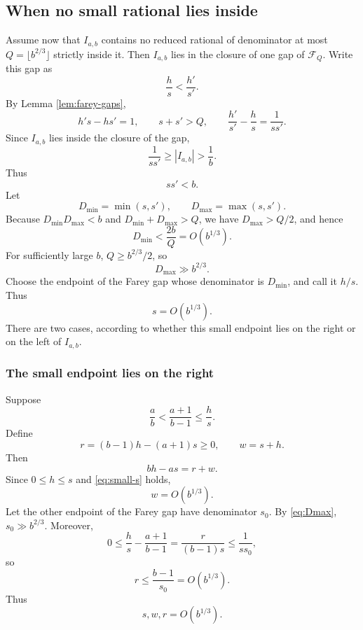 \documentclass[11pt]{article}
\numberwithin{equation}{section}
\theoremstyle{definition}
\theoremstyle{remark}
\newcommand{\1}{\mathbf 1}
\begin{document}
\subsection{When no small rational lies inside}

Assume now that $I_{a,b}$ contains no reduced rational of denominator at most $Q=\lfloor b^{2/3}\rfloor$ strictly inside it.  Then $I_{a,b}$ lies in the closure of one gap of $\mathcal F_Q$.  Write this gap as
\[
  \frac hs<\frac{h'}{s'}.
\]
By Lemma \ref{lem:farey-gaps},
\[
  h's-hs'=1,
  \qquad s+s'>Q,
  \qquad \frac{h'}{s'}-\frac hs=\frac1{ss'}.
\]
Since $I_{a,b}$ lies inside the closure of the gap,
\[
  \frac1{ss'}\ge |I_{a,b}|>\frac1b.
\]
Thus
\begin{equation}\label{eq:ssprime}
  ss'<b.
\end{equation}
Let
\[
  D_{\min}=\min(s,s'),\qquad D_{\max}=\max(s,s').
\]
Because $D_{\min}D_{\max}<b$ and $D_{\min}+D_{\max}>Q$, we have $D_{\max}>Q/2$, and hence
\begin{equation}\label{eq:Dmin}
  D_{\min}<\frac{2b}{Q}=O(b^{1/3}).
\end{equation}
For sufficiently large $b$, $Q\ge b^{2/3}/2$, so
\begin{equation}\label{eq:Dmax}
  D_{\max}\gg b^{2/3}.
\end{equation}
Choose the endpoint of the Farey gap whose denominator is $D_{\min}$, and call it $h/s$.  Thus
\begin{equation}\label{eq:small-s}
  s=O(b^{1/3}).
\end{equation}
There are two cases, according to whether this small endpoint lies on the right or on the left of $I_{a,b}$.

\subsubsection{The small endpoint lies on the right}

Suppose
\[
  \frac ab<\frac{a+1}{b-1}\le \frac hs.
\]
Define
\[
  r=(b-1)h-(a+1)s\ge0,
  \qquad
  w=s+h.
\]
Then
\begin{equation}\label{eq:rw-right}
  bh-as=r+w.
\end{equation}
Since $0\le h\le s$ and \eqref{eq:small-s} holds,
\[
  w=O(b^{1/3}).
\]
Let the other endpoint of the Farey gap have denominator $s_0$.  By \eqref{eq:Dmax}, $s_0\gg b^{2/3}$.  Moreover,
\[
  0\le \frac hs-\frac{a+1}{b-1}=\frac{r}{(b-1)s}\le \frac1{ss_0},
\]
so
\[
  r\le \frac{b-1}{s_0}=O(b^{1/3}).
\]
Thus
\begin{equation}\label{eq:srw-small-right}
  s,w,r=O(b^{1/3}).
\end{equation}
\end{document}
